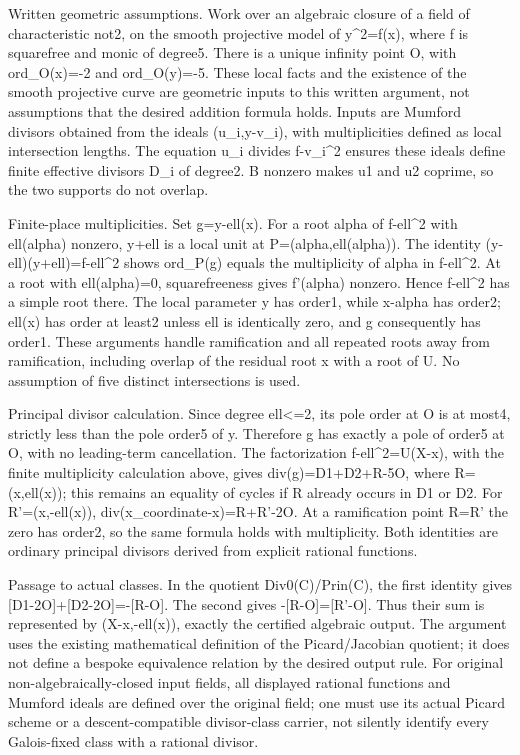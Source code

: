 \documentclass[10pt]{article}
\begin{document}
Written geometric assumptions. Work over an algebraic closure of a field of characteristic not2, on the smooth projective model of y\textasciicircum{}2=f(x), where f is squarefree and monic of degree5. There is a unique infinity point O, with ord\_O(x)=-2 and ord\_O(y)=-5. These local facts and the existence of the smooth projective curve are geometric inputs to this written argument, not assumptions that the desired addition formula holds. Inputs are Mumford divisors obtained from the ideals (u\_i,y-v\_i), with multiplicities defined as local intersection lengths. The equation u\_i divides f-v\_i\textasciicircum{}2 ensures these ideals define finite effective divisors D\_i of degree2. B nonzero makes u1 and u2 coprime, so the two supports do not overlap.\par\medskip
Finite-place multiplicities. Set g=y-ell(x). For a root alpha of f-ell\textasciicircum{}2 with ell(alpha) nonzero, y+ell is a local unit at P=(alpha,ell(alpha)). The identity (y-ell)(y+ell)=f-ell\textasciicircum{}2 shows ord\_P(g) equals the multiplicity of alpha in f-ell\textasciicircum{}2. At a root with ell(alpha)=0, squarefreeness gives f'(alpha) nonzero. Hence f-ell\textasciicircum{}2 has a simple root there. The local parameter y has order1, while x-alpha has order2; ell(x) has order at least2 unless ell is identically zero, and g consequently has order1. These arguments handle ramification and all repeated roots away from ramification, including overlap of the residual root x with a root of U. No assumption of five distinct intersections is used.\par\medskip
Principal divisor calculation. Since degree ell<=2, its pole order at O is at most4, strictly less than the pole order5 of y. Therefore g has exactly a pole of order5 at O, with no leading-term cancellation. The factorization f-ell\textasciicircum{}2=U(X-x), with the finite multiplicity calculation above, gives div(g)=D1+D2+R-5O, where R=(x,ell(x)); this remains an equality of cycles if R already occurs in D1 or D2. For R'=(x,-ell(x)), div(x\_coordinate-x)=R+R'-2O. At a ramification point R=R' the zero has order2, so the same formula holds with multiplicity. Both identities are ordinary principal divisors derived from explicit rational functions.\par\medskip
Passage to actual classes. In the quotient Div0(C)/Prin(C), the first identity gives [D1-2O]+[D2-2O]=-[R-O]. The second gives -[R-O]=[R'-O]. Thus their sum is represented by (X-x,-ell(x)), exactly the certified algebraic output. The argument uses the existing mathematical definition of the Picard/Jacobian quotient; it does not define a bespoke equivalence relation by the desired output rule. For original non-algebraically-closed input fields, all displayed rational functions and Mumford ideals are defined over the original field; one must use its actual Picard scheme or a descent-compatible divisor-class carrier, not silently identify every Galois-fixed class with a rational divisor.\par\medskip
\end{document}
